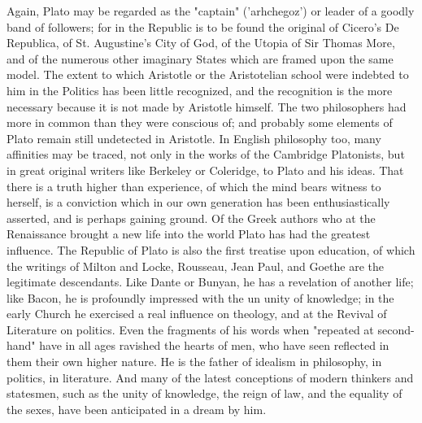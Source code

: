 Again, Plato may be regarded as the "captain" ('arhchegoz') or leader of a goodly band of followers; for in the Republic is to be found the original of Cicero's De Republica, of St. Augustine's City of God, of the Utopia of Sir Thomas More, and of the numerous other imaginary States which are framed upon the same model. The extent to which Aristotle or the Aristotelian school were indebted to him in the Politics has been little recognized, and the recognition is the more necessary because it is not made by Aristotle himself. The two philosophers had more in common than they were conscious of; and probably some elements of Plato remain still undetected in Aristotle. In English philosophy too, many affinities may be traced, not only in the works of the Cambridge Platonists, but in great original writers like Berkeley or Coleridge, to Plato and his ideas. That there is a truth higher than experience, of which the mind bears witness to herself, is a conviction which in our own generation has been enthusiastically asserted, and is perhaps gaining ground. Of the Greek authors who at the Renaissance brought a new life into the world Plato has had the greatest influence. The Republic of Plato is also the first treatise upon education, of which the writings of Milton and Locke, Rousseau, Jean Paul, and Goethe are the legitimate descendants. Like Dante or Bunyan, he has a revelation of another life; like Bacon, he is profoundly impressed with the un unity of knowledge; in the early Church he exercised a real influence on theology, and at the Revival of Literature on politics. Even the fragments of his words when "repeated at second-hand" have in all ages ravished the hearts of men, who have seen reflected in them their own higher nature. He is the father of idealism in philosophy, in politics, in literature. And many of the latest conceptions of modern thinkers and statesmen, such as the unity of knowledge, the reign of law, and the equality of the sexes, have been anticipated in a dream by him.

